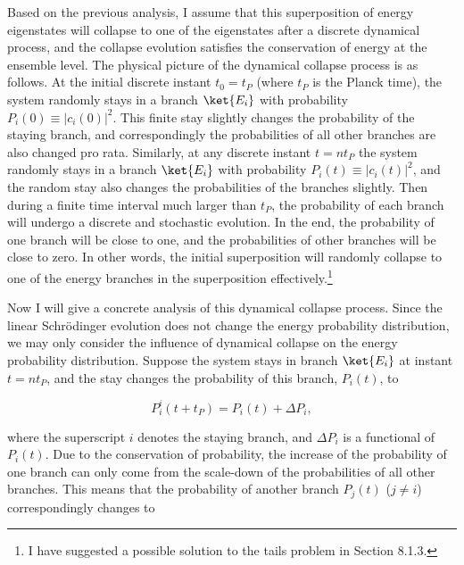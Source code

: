 Based on the previous analysis, I assume that this superposition of energy eigenstates will collapse to one of the eigenstates after a discrete dynamical process, and the collapse evolution satisfies the conservation of energy at the ensemble level. The physical picture of the dynamical collapse process is as follows. At the initial discrete instant $t_0=t_P$ (where $t_P$ is the Planck time), the system randomly stays in a branch $\ket{E_{i}}$ with probability $P_i(0) \equiv |c_i(0)|^2$.
This finite stay slightly changes the probability of the staying branch, and correspondingly the probabilities of all other branches are also changed pro rata. Similarly, at any discrete instant $t=n t_P$ the system randomly stays in a branch $\ket{E_{i}}$ with probability $P_i(t) \equiv |c_i(t)|^2$, and the random stay also changes the probabilities of the branches slightly. Then during a finite time interval much larger than $t_P$, the probability of each branch will undergo a discrete and stochastic evolution. In the end, the probability of one branch will be close to one, and the probabilities of other branches will be close to zero. In other words, the initial superposition will randomly collapse to one of the energy branches in the superposition effectively.\footnote{I have suggested a possible solution to the tails problem in Section 8.1.3.}

Now I will give a concrete analysis of this dynamical collapse process. Since the linear Schr\"{o}dinger evolution does not change the energy probability distribution, we may only consider the influence of dynamical collapse on the energy probability distribution. Suppose the system stays in branch $\ket{E_{i}}$ at instant $t=n t_P$, and the stay changes the probability of this branch, $P_{i}(t)$, to

\begin{equation}
P_{i}^i (t+t_P)=P_{i}(t)+\Delta P_{i},
\label{}
\end{equation} 

\noindent where the superscript $i$ denotes the staying branch, and $\Delta P_i$ is a functional of $P_{i}(t)$. Due to the conservation of probability, the increase of the probability of one branch can only come from the scale-down of the probabilities of all other branches. This means that the probability of another branch $P_{j}(t)$ ($j \neq i$) correspondingly changes to

